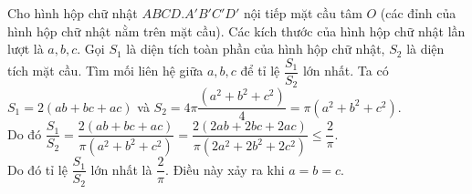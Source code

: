 \begin{ex}%
    Cho hình hộp chữ nhật $ABCD.A'B'C'D'$ nội tiếp mặt cầu tâm $O$ (các đỉnh của hình hộp chữ nhật nằm trên mặt cầu). Các kích thước của hình hộp chữ nhật lần lượt là $a, b, c$. Gọi $S_1$ là diện tích toàn phần của hình hộp chữ nhật, $S_2$ là diện tích mặt cầu. Tìm mối liên hệ giữa $a, b, c$ để tỉ lệ $\dfrac{S_1}{S_2}$ lớn nhất.
\loigiai
    {
    Ta có $S_1=2(ab+bc+ac)$ và $S_2=4\pi\dfrac{\left(a^2+b^2+c^2\right)}{4}=\pi\left(a^2+b^2+c^2\right)$.\\Do đó $\dfrac{S_1}{S_2}=\dfrac{2(ab+bc+ac)}{\pi\left(a^2+b^2+c^2\right)}=\dfrac{2(2ab+2bc+2ac)}{\pi\left(2a^2+2b^2+2c^2\right)}\leq\dfrac{2}{\pi}$.\\Do đó tỉ lệ $\dfrac{S_1}{S_2}$ lớn nhất là $\dfrac{2}{\pi}$. Điều này xảy ra khi $a=b=c$.}
    \end{ex}

